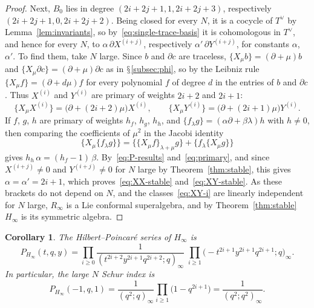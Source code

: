 \documentclass[11pt]{amsart}
\numberwithin{equation}{section}
\renewcommand{\S}{\mbox{$\mathsection$}}
\newtheorem{corollary}[theorem]{Corollary}
\theoremstyle{definition}
\theoremstyle{remark}
\newcommand{\dd}{\partial}
\begin{document}
\begin{proof}
Next, $B_0$ lies in degree $(2i+2j+1,1,2i+2j+3)$, respectively $(2i+2j+1,0,2i+2j+2)$. Being closed for every $N$, it is a cocycle of $T^\vee$ by Lemma~\ref{lem:invariants}, so by~\eqref{eq:single-trace-basis} it is cohomologous in $T^\vee$, and hence for every $N$, to $\alpha\,\dd X^{(i+j)}$, respectively $\alpha'\,\dd Y^{(i+j)}$, for constants $\alpha$, $\alpha'$. To find them, take $N$ large. Since $b$ and $\dd c$ are traceless, $\{X_\mu b\}=(\dd+\mu)b$ and $\{X_\mu\dd c\}=(\dd+\mu)\dd c$ as in \S\ref{subsec:phi}, so by the Leibniz rule $\{X_\mu f\}=(\dd+d\mu)f$ for every polynomial $f$ of degree $d$ in the entries of $b$ and $\dd c$. Thus $X^{(i)}$ and $Y^{(i)}$ are primary of weights $2i+2$ and $2i+1$:
\begin{equation}\label{eq:primary}
\{X_\mu X^{(i)}\}=\bigl(\dd+(2i+2)\mu\bigr)X^{(i)},\qquad \{X_\mu Y^{(i)}\}=\bigl(\dd+(2i+1)\mu\bigr)Y^{(i)} .
\end{equation}
If $f$, $g$, $h$ are primary of weights $h_f$, $h_g$, $h_h$, and $\{f_\lambda g\}=(\alpha\dd+\beta\lambda)h$ with $h\ne0$, then comparing the coefficients of $\mu^2$ in the Jacobi identity
\begin{equation}\label{eq:jacobi-primary}
\{X_\mu\{f_\lambda g\}\}=\{\{X_\mu f\}_{\lambda+\mu}g\}+\{f_\lambda\{X_\mu g\}\}
\end{equation}
gives $h_h\,\alpha=(h_f-1)\,\beta$. By~\eqref{eq:P-results} and~\eqref{eq:primary}, and since $X^{(i+j)}\ne0$ and $Y^{(i+j)}\ne0$ for $N$ large by Theorem~\ref{thm:stable}, this gives $\alpha=\alpha'=2i+1$, which proves~\eqref{eq:XX-stable} and~\eqref{eq:XY-stable}. As these brackets do not depend on $N$, and the classes~\eqref{eq:XY-i} are linearly independent for $N$ large, $R_\infty$ is a Lie conformal superalgebra, and by Theorem~\ref{thm:stable} $H_\infty$ is its symmetric algebra.
\end{proof}

\begin{corollary}\label{cor:stable-index}
The Hilbert--Poincar\'e series of $H_\infty$ is
\begin{equation}\label{eq:stable-poincare}
P_{H_\infty}(t,q,y)=\prod_{i\ge0}\frac1{(t^{2i+2}y^{2i+1}q^{2i+2};q)_\infty}\;\prod_{i\ge1}\bigl(-t^{2i+1}y^{2i+1}q^{2i+1};q\bigr)_\infty .
\end{equation}
In particular, the large $N$ Schur index is
\begin{equation}\label{eq:stable-schur}
P_{H_\infty}(-1,q,1)=\frac1{(q^2;q)_\infty}\prod_{i\ge1}\bigl(1-q^{2i+1}\bigr)=\frac1{(q^2;q^2)_\infty}.
\end{equation}
\end{corollary}
\end{document}
